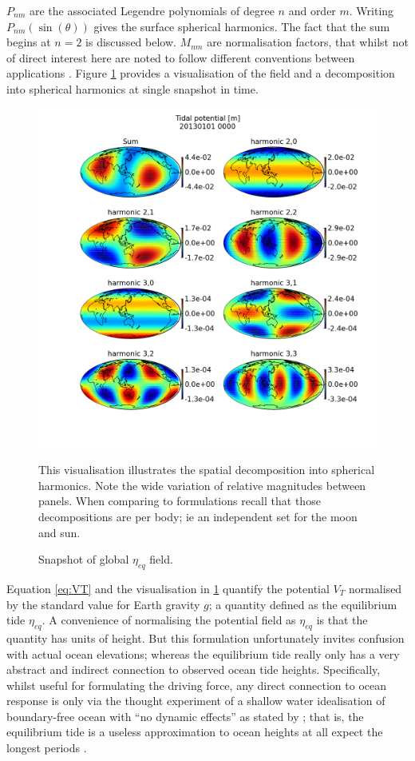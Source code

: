 $P_{nm}$ are the associated Legendre polynomials of degree $n$ and order $m$.  Writing $P_{nm}(\sin(\theta))$ gives the surface spherical harmonics.  The fact that the sum begins at $n=2$ is discussed below.
$M_{nm}$ are normalisation factors, that whilst not of direct interest here are noted to follow different conventions between applications \citep{IERS2003}.
Figure \ref{fig:VTmaps} provides a visualisation of the field and a decomposition into spherical harmonics at single snapshot in time.
\begin{figure}[!hbt] \centering
    \includegraphics[width=\figwidthBig]{figures/maps/tidal_potential_spatial_20130101_0000.png}
    \caption{Snapshot of global $\eta_{eq}$ field.}{This visualisation illustrates the spatial decomposition into spherical harmonics.  Note the wide variation of relative magnitudes between panels. When comparing to formulations recall that those decompositions are per body; ie an independent set for the moon and sun. }
    \label{fig:VTmaps}
\end{figure}
Equation \ref{eq:VT} and the visualisation in \ref{fig:VTmaps} quantify the potential $V_T$ normalised by the standard value for Earth gravity $g$; a quantity defined as the equilibrium tide $\eta_{eq}$.  
A convenience of normalising the potential field as $\eta_{eq}$ is that the quantity has units of height. But this formulation unfortunately invites confusion with actual ocean elevations; whereas the equilibrium tide really only has a very abstract and indirect connection to observed ocean tide heights.
Specifically, whilst useful for formulating the driving force, any direct connection to ocean response is only via the thought experiment of a shallow water idealisation of boundary-free ocean with ``no dynamic effects'' as stated by \citet[Eq 9.8.3]{gill1982atmosphere}; that is, the equilibrium tide is a useless approximation to ocean heights at all expect the longest periods \citep{Egbert:2003jd}.


